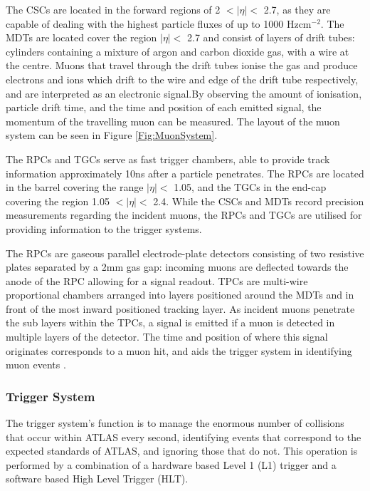 \documentclass[12pt,a4paper,epsf,portrait,times,epsfig]{article}
\begin{document}
		The CSCs are located in the forward regions of 2 $< |\eta| <$ 2.7, as they are capable of dealing with the highest particle fluxes of up to 1000 Hzcm$^{-2}$. The MDTs are located cover the region $|\eta| <$ 2.7 and consist of layers of drift tubes: cylinders containing a mixture of argon and carbon dioxide gas, with a wire at the centre. Muons that travel through the drift tubes ionise the gas and produce electrons and ions which drift to the wire and edge of the drift tube respectively, and are interpreted as an electronic signal.By observing the amount of ionisation, particle drift time, and the time and position of each emitted signal, the momentum of the travelling muon can be measured. The layout of the muon system can be seen in Figure \ref{Fig:MuonSystem}. \par
		
		The RPCs and TGCs serve as fast trigger chambers, able to provide track information approximately 10ns after a particle penetrates. The RPCs are located in the barrel covering the range $|\eta| <$ 1.05, and the TGCs in the end-cap covering the region 1.05 $< |\eta| <$ 2.4. While the CSCs and MDTs record precision measurements regarding the incident muons, the RPCs and TGCs are utilised for providing information to the trigger systems. \par
		
		The RPCs are gaseous parallel electrode-plate detectors consisting of two resistive plates separated by a 2mm gas gap: incoming muons are deflected towards the anode of the RPC allowing for a signal readout. TPCs are multi-wire proportional chambers arranged into layers positioned around the MDTs and in front of the most inward positioned tracking layer. As incident muons penetrate the sub layers within the TPCs, a signal is emitted if a muon is detected in multiple layers of the detector. The time and position of where this signal originates corresponds to a muon hit, and aids the trigger system in identifying muon events 
		\cite{ATLAS-TDR-01, ATLAS-TDR-02, Article:ATLASDesignPaper}. \par 
		
		
		\subsubsection{Trigger System}
		
		The trigger system’s function is to manage the enormous number of collisions that occur within ATLAS every second, identifying events that correspond to the expected standards of ATLAS, and ignoring those that do not. This operation is performed by a combination of a hardware based Level 1 (L1) trigger and a software based High Level Trigger (HLT). \par
		
\end{document}
